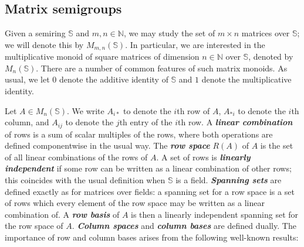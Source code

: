 \documentclass[11pt]{article}
\newcommand{\defn}[1]{\textbf{\textit{#1}}}
\numberwithin{equation}{section}
\newcommand{\N}{\mathbb{N}}
\begin{document}
\subsection{Matrix semigroups}
\label{sec:matsemigp}
Given a semiring $\mathbb{S}$ and $m, n \in \N$, we may study the set of $m
\times n$ matrices over $\mathbb{S}$; we will denote this by $M_{m,
  n}(\mathbb{S})$. In particular, we are interested in the multiplicative monoid
of square matrices of dimension $n \in
\N$ over $\mathbb{S}$, denoted by $M_n(\mathbb{S})$.
There are a number of common features of such matrix monoids. As usual, we let
$0$ denote the additive identity of $\mathbb{S}$ and $1$ denote the
multiplicative identity.

Let $A \in M_n(\mathbb{S})$. We write $A_{i*}$ to denote the $i$th row of $A$,
$A_{*i}$ to denote the $i$th column, and $A_{ij}$ to denote the $j$th entry of
the $i$th row. A \defn{linear combination} of rows is a sum of scalar multiples
of the rows, where both operations are defined componentwise in the usual way.
The \defn{row space} $R(A)$ of $A$ is the set of all linear combinations of the
rows of $A$.  A set of rows is \defn{linearly independent} if some row can be
written as a linear combination of other rows; this coincides with the usual
definition when $\mathbb{S}$ is a field. \defn{Spanning sets} are defined
exactly as for matrices over fields: a spanning set for a row space is a set of
rows which every element of the row space may be written as a linear combination
of. A \defn{row basis} of $A$ is then a linearly independent spanning set for
the row space of $A$. \defn{Column spaces} and \defn{column bases} are defined
dually. The importance of row and column bases arises from the following
well-known results:
\end{document}
